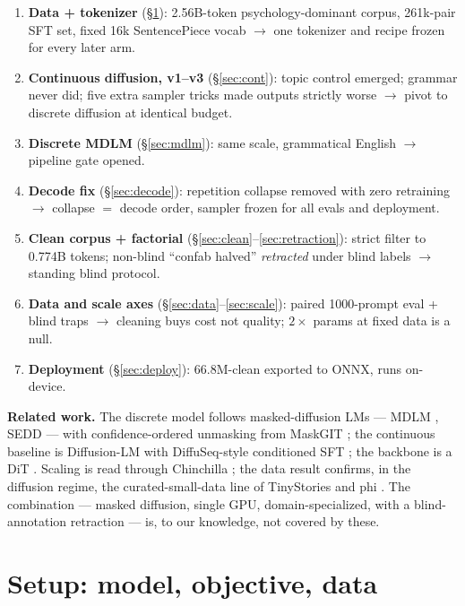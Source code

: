 \documentclass[11pt]{article}
\newcommand{\sixsix}{66.8M}
\begin{document}
\begin{enumerate}\itemsep1pt
\item \textbf{Data + tokenizer} (\S\ref{sec:setup}): 2.56B-token psychology-dominant corpus, 261k-pair SFT set, fixed 16k SentencePiece vocab $\rightarrow$ one tokenizer and recipe frozen for every later arm.
\item \textbf{Continuous diffusion, v1--v3} (\S\ref{sec:cont}): topic control emerged; grammar never did; five extra sampler tricks made outputs strictly worse $\rightarrow$ pivot to discrete diffusion at identical budget.
\item \textbf{Discrete MDLM} (\S\ref{sec:mdlm}): same scale, grammatical English $\rightarrow$ pipeline gate opened.
\item \textbf{Decode fix} (\S\ref{sec:decode}): repetition collapse removed with zero retraining $\rightarrow$ collapse $=$ decode order, sampler frozen for all evals and deployment.
\item \textbf{Clean corpus + factorial} (\S\ref{sec:clean}--\ref{sec:retraction}): strict filter to 0.774B tokens; non-blind ``confab halved'' \emph{retracted} under blind labels $\rightarrow$ standing blind protocol.
\item \textbf{Data and scale axes} (\S\ref{sec:data}--\ref{sec:scale}): paired 1000-prompt eval + blind traps $\rightarrow$ cleaning buys cost not quality; $2\times$ params at fixed data is a null.
\item \textbf{Deployment} (\S\ref{sec:deploy}): \sixsix-clean exported to ONNX, runs on-device.
\end{enumerate}

\textbf{Related work.} The discrete model follows masked-diffusion LMs --- MDLM \citep{sahoo2024mdlm}, SEDD \citep{lou2024sedd} --- with confidence-ordered unmasking from MaskGIT \citep{chang2022maskgit}; the continuous baseline is Diffusion-LM \citep{li2022diffusionlm} with DiffuSeq-style conditioned SFT \citep{gong2023diffuseq}; the backbone is a DiT \citep{peebles2023dit}. Scaling is read through Chinchilla \citep{hoffmann2022chinchilla}; the data result confirms, in the diffusion regime, the curated-small-data line of TinyStories \citep{eldan2023tinystories} and phi \citep{gunasekar2023textbooks}. The combination --- masked diffusion, single GPU, domain-specialized, with a blind-annotation retraction --- is, to our knowledge, not covered by these.

\section{Setup: model, objective, data}\label{sec:setup}
\end{document}
